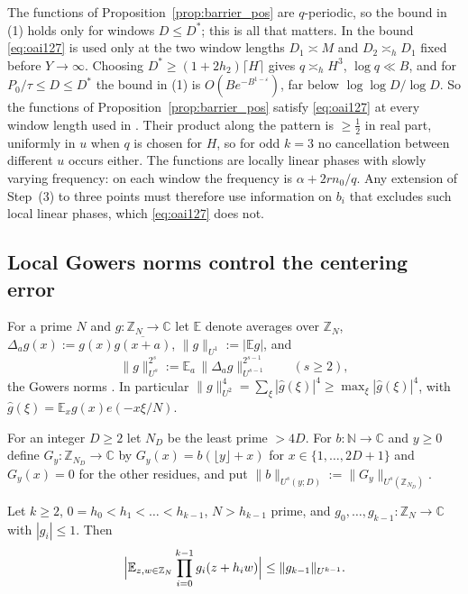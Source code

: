 The functions of Proposition~\ref{prop:barrier_pos} are $q$-periodic, so the bound in (1) holds only for windows $D\le D^*$; this is all that matters. In \cite[pp.~54--55]{OpenAI2026} the bound \eqref{eq:oai127} is used only at the two window lengths $D_1\asymp M$ and $D_2\asymp_hD_1$ fixed before $Y\to\infty$. Choosing $D^*\ge(1+2h_2)\lceil H\rceil$ gives $q\asymp_{h}H^3$, $\log q\ll B$, and for $P_0/\tau\le D\le D^*$ the bound in (1) is $O(Be^{-B^{1-\varepsilon}})$, far below $\log\log D/\log D$. So the functions of Proposition~\ref{prop:barrier_pos} satisfy \eqref{eq:oai127} at every window length used in \cite[\S12]{OpenAI2026}. Their product along the pattern is $\ge\frac12$ in real part, uniformly in $u$ when $q$ is chosen for $H$, so for odd $k=3$ no cancellation between different $u$ occurs either. The functions are locally linear phases with slowly varying frequency: on each window the frequency is $\alpha+2rn_0/q$. Any extension of Step~(3) to three points must therefore use information on $b_i$ that excludes such local linear phases, which \eqref{eq:oai127} does not.

\subsection{Local Gowers norms control the centering error}
\label{subsec:local_gowers}

For a prime $N$ and $g:\mathbb Z_N\to\mathbb C$ let $\mathbb E$ denote averages over $\mathbb Z_N$, $\Delta_ag(x):=g(x)\overline{g(x+a)}$, $\|g\|_{U^1}:=|\mathbb Eg|$, and
\begin{equation}
\|g\|_{U^{s}}^{2^{s}}:=\mathbb E_{a}\,\|\Delta_ag\|_{U^{s-1}}^{2^{s-1}}\qquad(s\ge2),
\label{eq:gowers}
\end{equation}
the Gowers norms \cite{Gowers2001}. In particular $\|g\|_{U^2}^4=\sum_\xi|\widehat g(\xi)|^4\ge\max_\xi|\widehat g(\xi)|^4$, with $\widehat g(\xi)=\mathbb E_xg(x)e(-x\xi/N)$.

\begin{definition}
\label{def:local_gowers}
For an integer $D\ge2$ let $N_D$ be the least prime $>4D$. For $b:\mathbb N\to\mathbb C$ and $y\ge0$ define $G_y:\mathbb Z_{N_D}\to\mathbb C$ by $G_y(x)=b(\lfloor y\rfloor+x)$ for $x\in\{1,\dots,2D+1\}$ and $G_y(x)=0$ for the other residues, and put $\|b\|_{U^s(y;D)}:=\|G_y\|_{U^s(\mathbb Z_{N_D})}$.
\end{definition}

\begin{lemma}
\label{lem:vonneumann}
Let $k\ge2$, $0=h_0<h_1<\dots<h_{k-1}$, $N>h_{k-1}$ prime, and $g_0,\dots,g_{k-1}:\mathbb Z_N\to\mathbb C$ with $|g_i|\le1$. Then
\begin{equation}
\Bigl|\mathbb E_{z,w\in\mathbb Z_N}\prod_{i=0}^{k-1}g_i(z+h_iw)\Bigr|\le\|g_{k-1}\|_{U^{k-1}}.
\label{eq:vonneumann}
\end{equation}
\end{lemma}

